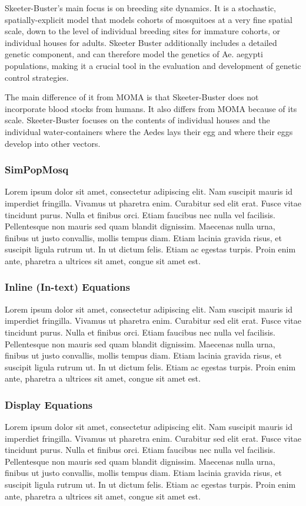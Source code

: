 Skeeter-Buster's main focus is on breeding site dynamics. It is a stochastic, spatially-explicit model that models cohorts of mosquitoes at a very fine spatial scale, down to the level of individual breeding sites for immature cohorts, or individual houses for adults. Skeeter Buster additionally includes a detailed genetic component, and can therefore model the genetics of Ae. aegypti populations, making it a crucial tool in the evaluation and development of genetic control strategies. 

The main difference of it from MOMA is that Skeeter-Buster does not incorporate blood stocks from humans. It also differs from MOMA because of its scale. Skeeter-Buster focuses on the contents of individual houses and the individual water-containers where the Aedes lays their egg and where their eggs develop into other vectors. 

\subsubsection{SimPopMosq}

Lorem ipsum dolor sit amet, consectetur adipiscing elit. Nam suscipit mauris id imperdiet fringilla. Vivamus ut pharetra enim. Curabitur sed elit erat. Fusce vitae tincidunt purus. Nulla et finibus orci. Etiam faucibus nec nulla vel facilisis. Pellentesque non mauris sed quam blandit dignissim. Maecenas nulla urna, finibus ut justo convallis, mollis tempus diam. Etiam lacinia gravida risus, et suscipit ligula rutrum ut. In ut dictum felis. Etiam ac egestas turpis. Proin enim ante, pharetra a ultrices sit amet, congue sit amet est.

\subsubsection{Inline (In-text) Equations}
Lorem ipsum dolor sit amet, consectetur adipiscing elit. Nam suscipit mauris id imperdiet fringilla. Vivamus ut pharetra enim. Curabitur sed elit erat. Fusce vitae tincidunt purus. Nulla et finibus orci. Etiam faucibus nec nulla vel facilisis. Pellentesque non mauris sed quam blandit dignissim. Maecenas nulla urna, finibus ut justo convallis, mollis tempus diam. Etiam lacinia gravida risus, et suscipit ligula rutrum ut. In ut dictum felis. Etiam ac egestas turpis. Proin enim ante, pharetra a ultrices sit amet, congue sit amet est.

\subsubsection{Display Equations}
Lorem ipsum dolor sit amet, consectetur adipiscing elit. Nam suscipit mauris id imperdiet fringilla. Vivamus ut pharetra enim. Curabitur sed elit erat. Fusce vitae tincidunt purus. Nulla et finibus orci. Etiam faucibus nec nulla vel facilisis. Pellentesque non mauris sed quam blandit dignissim. Maecenas nulla urna, finibus ut justo convallis, mollis tempus diam. Etiam lacinia gravida risus, et suscipit ligula rutrum ut. In ut dictum felis. Etiam ac egestas turpis. Proin enim ante, pharetra a ultrices sit amet, congue sit amet est.


